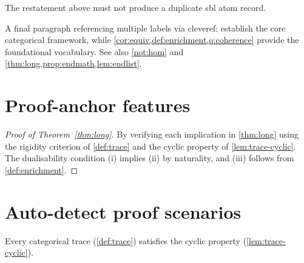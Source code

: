 \documentclass{article}
\numberwithin{equation}{section}
\begin{document}
\CoherenceThm*

The restatement above must not produce a duplicate sbl atom record.

A final paragraph referencing multiple labels via cleveref:
 establish the core
categorical framework, while
\cref{cor:equiv,def:enrichment,q:coherence} provide the
foundational vocabulary.  See also \autoref{not:hom} and
\cref{thm:long,prop:endmath,lem:endlist}.


\section{Proof-anchor features}
\label{sec:w04proof}

\begin{proof}[Proof of Theorem~\ref{thm:long}]%
By verifying each implication in \cref{thm:long} using the rigidity
criterion of \cref{def:trace} and the cyclic property of \cref{lem:trace-cyclic}.
The dualisability condition (i) implies (ii) by naturality, and (iii)
follows from \cref{def:enrichment}.
\end{proof}

\section{Auto-detect proof scenarios}
\label{sec:w05a1}

\begin{theorem}\label{thm:s9-backward}
Every categorical trace (\cref{def:trace}) satisfies the cyclic
property (\cref{lem:trace-cyclic}).
\end{theorem}
\end{document}
